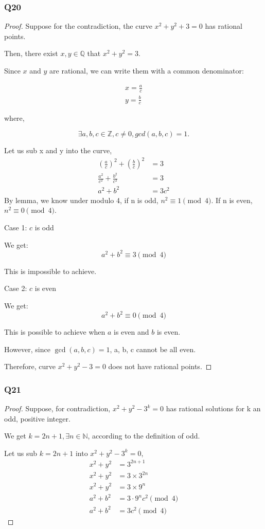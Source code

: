 \documentclass[10pt, leqno21]{article}
\theoremstyle{plain}
\theoremstyle{definition}
\theoremstyle{remark}
\theoremstyle{definition}
\newcommand{\N}{\mathbb{N}}
\newcommand{\Z}{\mathbb{Z}}
\newcommand{\Q}{\mathbb{Q}}
\begin{document}
\subsubsection*{Q20}
\begin{proof}
  Suppose for the contradiction, the curve $x^2 + y^2 + 3 = 0$ has rational points. 

  Then, there exist $x, y \in \Q$ that $x^2 + y^2 = 3$.

  Since $x$ and $y$ are rational, we can write them with a common denominator: 

  \begin{align*}
    x = \frac{a}{c} \\
    y = \frac{b}{c}
  \end{align*}

  where, 

  $$\exists a, b, c \in \Z, c \neq 0, gcd(a, b, c) = 1.$$

  Let us sub x and y into the curve, 
  \begin{align*}
    \left(\frac{a}{c}\right)^2 + \left(\frac{b}{c}\right)^2 &= 3 \\
    \frac{a^2}{c^2} + \frac{b^2}{c^2} &= 3 \\
    a^2 + b^2 &= 3c^2
  \end{align*}
  By lemma, we know under modulo 4, if n is odd, $n^2 \equiv 1\pmod{4}$. If n is even, $n^2 \equiv0\pmod{4}$.

  Case 1: $c$ is odd

  We get:
  \[
    a^2 + b^2 \equiv 3\pmod{4}
  \]

  This is impossible to achieve. 

  Case 2: $c$ is even

  We get:
  \[
    a^2 + b^2 \equiv 0\pmod{4}
  \]

  This is possible to achieve when $a$ is even and $b$ is even. 

  However, since $\gcd(a, b, c) = 1$, a, b, c cannot be all even.

  Therefore, curve $x^2 + y^2 - 3 = 0$ does not have rational points. 

\end{proof}

\subsubsection*{Q21}
\begin{proof}
  Suppose, for contradiction, $x^2 + y^2 - 3^k = 0$ has rational solutions for k an odd, positive integer. 

  We get $k = 2n + 1, \exists n \in \N$, according to the definition of odd. 

  Let us sub $k = 2n + 1$ into $x^2 + y^2 - 3^k = 0$,
  \begin{align*}
    x^2 + y^2 &= 3^{2n + 1} \\
    x^2 + y^2 &= 3 \times 3^{2n} \\
    x^2  + y^2  &= 3 \times 9^n \\
    a^2 + b^2 &= 3 \cdot 9^nc^2\pmod{4}\\
    a^2 + b^2  &= 3c^2\pmod{4}
  \end{align*}
\end{proof}
\end{document}
